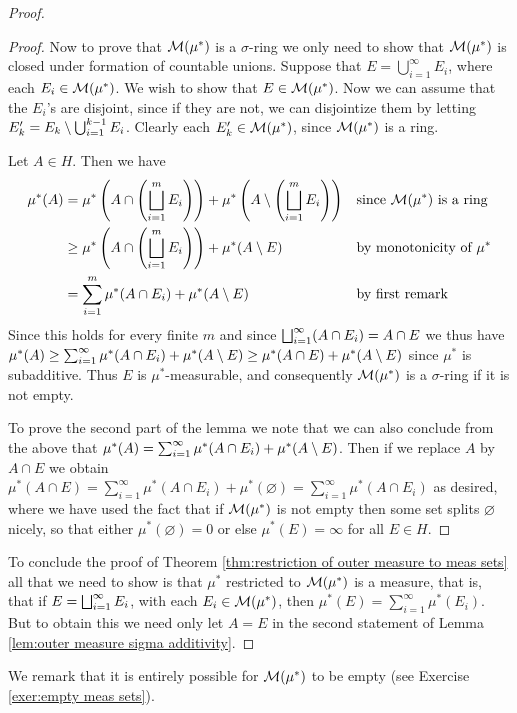 \begin{proof}
\begin{proof}
Now to prove that ${\cal M}(\mu^*)$ is a $\sigma$-ring we only need to show that ${\cal M}(\mu^*)$ is closed under formation of countable unions. Suppose that $E=\bigcup_{i=1}^\infty E_i$, where each $E_i \in {\cal M}(\mu^*)$. We wish to show that $E \in {\cal M}(\mu^*)$. Now we can assume that the $E_i$'s are disjoint, since if they are not, we can disjointize them by letting $E_k'=E_k\setminus\bigcup_{i=1}^{k-1} E_i$. Clearly each $E_{k}' \in {\cal M}(\mu^*)$, since ${\cal M}(\mu^*)$ is a ring.

Let $A \in {H}$. Then we have
\begin{align*}
    \mu^*(A)&=\mu^*\left(A\cap\left(\bigsqcup_{i=1}^mE_i\right)\right)+\mu^*\left(A\setminus\left(\bigsqcup_{i=1}^mE_i\right)\right)& &\text{since }{\cal M}(\mu^*)\text{ is a ring}\\
    &\geq\mu^*\left(A\cap\left(\bigsqcup_{i=1}^mE_i\right)\right)+\mu^*(A\setminus E)& &\text{by monotonicity of }\mu^*\\
    &=\sum_{i=1}^m \mu^*(A \cap E_i)+\mu^*(A\setminus E)& &\text{by first remark}
\end{align*}
Since this holds for every finite $m$ and since $\bigsqcup_{i=1}^\infty(A \cap E_i)=A \cap E$ we thus have $\mu^*(A) \geq \sum_{i=1}^\infty \mu^*(A \cap E_i)+\mu^*(A\setminus E) \geq \mu^*(A \cap E)+\mu^*(A\setminus E)$ since $\mu^*$ is subadditive. Thus $E$ is $\mu^*$-measurable, and consequently ${\cal M}(\mu^*)$ is a $\sigma$-ring if it is not empty.

To prove the second part of the lemma we note that we can also conclude from the above that $\mu^*(A)=\sum_{i=1}^\infty \mu^*(A \cap E_i)+\mu^*(A\setminus E)$. Then if we replace $A$ by $A \cap E$ we obtain $\mu^*(A \cap E)=\sum_{i=1}^\infty \mu^*(A \cap E_i)+\mu^*(\varnothing)=\sum_{i=1}^\infty \mu^*(A \cap E_i)$ as desired, where we have used the fact that if ${\cal M}(\mu^*)$ is not empty then some set splits $\varnothing$ nicely, so that either $\mu^*(\varnothing)=0$ or else $\mu^*(E)=\infty$ for all $E \in H$.
\end{proof}

To conclude the proof of Theorem \ref{thm:restriction of outer measure to meas sets} all that we need to show is that $\mu^*$ restricted to ${\cal M}(\mu^*)$ is a measure, that is, that if $E=\bigsqcup_{i=1}^\infty E_i$, with each $E_i\in{\cal M}(\mu^*)$, then $\mu^*(E)=\sum_{i=1}^\infty \mu^*(E_i)$. But to obtain this we need only let $A=E$ in the second statement of Lemma \ref{lem:outer measure sigma additivity}.
\end{proof}

We remark that it is entirely possible for ${\cal M}(\mu^*)$ to be empty (see Exercise \ref{exer:empty meas sets}).

